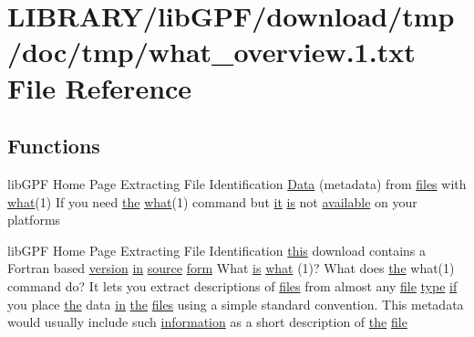 \hypertarget{what__overview_81_8txt}{}\section{L\+I\+B\+R\+A\+R\+Y/lib\+G\+P\+F/download/tmp/doc/tmp/what\+\_\+overview.1.txt File Reference}
\label{what__overview_81_8txt}
\subsection*{Functions}
\begin{DoxyCompactItemize}
\item 
lib\+G\+PF Home Page Extracting File Identification \hyperlink{what__overview_81_8txt_a7483c2b9bbf430d46a9822c512d71bea}{Data} (metadata) from \hyperlink{ufpp__overview_81_8txt_a5673f2294ff1627be40c90eae33141ca}{files} with \hyperlink{what__overview_81_8txt_a8cdf8efd1b900d6dce77a3f97edb2216}{what}(1) If you need \hyperlink{M__stopwatch_83_8txt_a0f266597de2e57eb3aa964927bb30e14}{the} \hyperlink{what__overview_81_8txt_a8cdf8efd1b900d6dce77a3f97edb2216}{what}(1) command but \hyperlink{what__overview_81_8txt_a1468cf345691ca45f70578e0b7abd264}{it} \hyperlink{intro__blas1_83_8txt_a42a91df93f840595de3019ceb5d1df23}{is} not \hyperlink{M__stopwatch_83_8txt_ab4765d078d076a26632c886ad3875761}{available} on your platforms
\item 
lib\+G\+PF Home Page Extracting File Identification \hyperlink{M__stopwatch_83_8txt_ad62a52042bb610eee5b36b5516caec22}{this} download contains a Fortran based \hyperlink{inquiry__stopwatch_83_8txt_aee378be19d20935dd436517beda00ee4}{version} \hyperlink{M__journal_83_8txt_afce72651d1eed785a2132bee863b2f38}{in} \hyperlink{ufpp__overview_81_8txt_a4d6669ece605d05985c83a04dd38e0ad}{source} \hyperlink{what__overview_81_8txt_ab6ccd3cf736f24d661599d9ce944e9bf}{form} What \hyperlink{intro__blas1_83_8txt_a42a91df93f840595de3019ceb5d1df23}{is} \hyperlink{what__overview_81_8txt_a8cdf8efd1b900d6dce77a3f97edb2216}{what} (1)? What does \hyperlink{M__stopwatch_83_8txt_a0f266597de2e57eb3aa964927bb30e14}{the} what(1) command do? It lets you extract descriptions of \hyperlink{ufpp__overview_81_8txt_a5673f2294ff1627be40c90eae33141ca}{files} from almost any \hyperlink{what__overview_81_8txt_a447b56c526e8da30e0dc94673727ee25}{file} \hyperlink{stop__watch_83_8txt_a70f0ead91c32e25323c03265aa302c1c}{type} \hyperlink{exit_87_8txt_a77395982f8d25581c808c40f3b634d90}{if} you place \hyperlink{M__stopwatch_83_8txt_a0f266597de2e57eb3aa964927bb30e14}{the} data \hyperlink{M__journal_83_8txt_afce72651d1eed785a2132bee863b2f38}{in} \hyperlink{M__stopwatch_83_8txt_a0f266597de2e57eb3aa964927bb30e14}{the} \hyperlink{ufpp__overview_81_8txt_a5673f2294ff1627be40c90eae33141ca}{files} using a simple standard convention. This metadata would usually include such \hyperlink{M__stopwatch_83_8txt_a9f7f0ce21871efda7da3eda76d1d3cff}{information} as a short description of \hyperlink{M__stopwatch_83_8txt_a0f266597de2e57eb3aa964927bb30e14}{the} \hyperlink{what__overview_81_8txt_a447b56c526e8da30e0dc94673727ee25}{file}

\end{DoxyCompactItemize}
